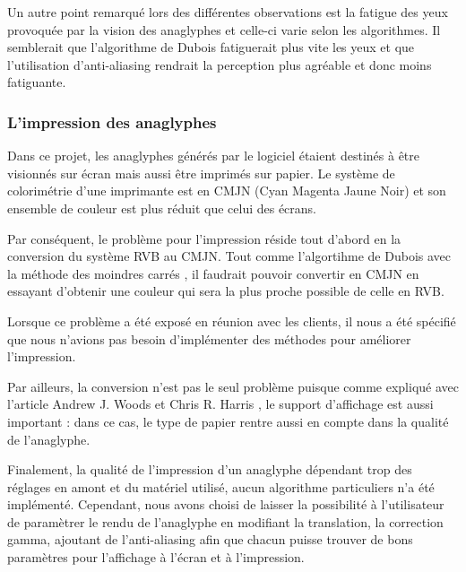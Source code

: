 Un autre point remarqué lors des différentes observations est la fatigue des yeux provoquée par la vision des anaglyphes et celle-ci varie selon les algorithmes. Il semblerait que l'algorithme de Dubois fatiguerait plus vite les yeux et que l'utilisation d'anti-aliasing rendrait la perception plus agréable et donc moins fatiguante. 

\subsubsection{L'impression des anaglyphes}
Dans ce projet, les anaglyphes générés par le logiciel étaient destinés à être visionnés sur écran mais aussi être imprimés sur papier. Le système de colorimétrie d'une imprimante est en CMJN (Cyan Magenta Jaune Noir) et son ensemble de couleur est plus réduit que celui des écrans. 


Par conséquent, le problème pour l'impression réside tout d'abord en la conversion du système RVB au CMJN. Tout comme l'algortihme de Dubois avec la méthode des moindres carrés \cite{algoDubois}, il faudrait pouvoir convertir en CMJN en essayant d'obtenir une couleur qui sera la plus proche possible de celle en RVB. 

Lorsque ce problème a été exposé en réunion avec les clients, il nous a été spécifié que nous n'avions pas besoin d'implémenter des méthodes pour améliorer l'impression. 

Par ailleurs, la conversion n'est pas le seul problème puisque comme expliqué avec l'article Andrew J. Woods et Chris R. Harris \cite{anaglypheDefaut}, le support d'affichage est aussi important : dans ce cas, le type de papier rentre aussi en compte dans la qualité de l'anaglyphe.

Finalement, la qualité de l'impression d'un anaglyphe dépendant trop des réglages en amont et du matériel utilisé, aucun algorithme particuliers n'a été implémenté. Cependant, nous avons choisi de laisser la possibilité à l'utilisateur de paramètrer le rendu de l'anaglyphe en modifiant la translation, la correction gamma, ajoutant de l'anti-aliasing afin que chacun puisse trouver de bons paramètres pour l'affichage à l'écran et à l'impression.
